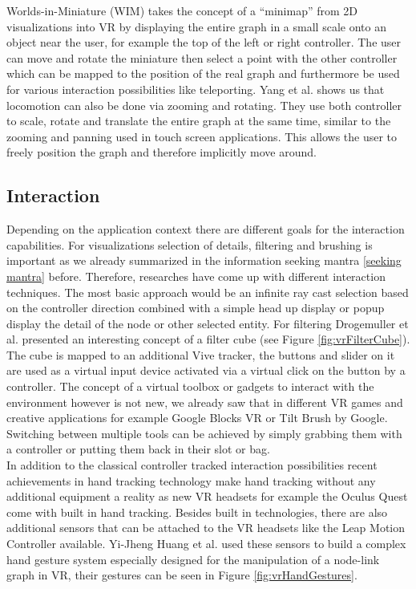 Worlds-in-Miniature (WIM) \cite{drogemuller_examining_2020} takes the concept of a “minimap” from 2D visualizations into VR by displaying the entire graph in a small scale onto an object near the user, for example the top of the left or right controller. The user can move and rotate the miniature then select a point with the other controller which can be mapped to the position of the real graph and furthermore be used for various interaction possibilities like teleporting. Yang et al. \cite{yang_embodied_2020} shows us that locomotion can also be done via zooming and rotating. They use both controller to scale, rotate and translate the entire graph at the same time, similar to the zooming and panning used in touch screen applications. This allows the user to freely position the graph and therefore implicitly move around.

\subsection{Interaction}

Depending on the application context there are different goals for the interaction capabilities. For visualizations selection of details, filtering and brushing is important as we already summarized in the information seeking mantra \ref{seeking mantra} before. Therefore, researches have come up with different interaction techniques. The most basic approach would be an infinite ray cast selection based on the controller direction combined with a simple head up display or popup display the detail of the node or other selected entity. 
For filtering Drogemuller et al. \cite{drogemuller_vrige_2017} presented an interesting concept of a filter cube (see Figure \ref{fig:vrFilterCube}). The cube is mapped to an additional Vive tracker, the buttons and slider on it are used as a virtual input device activated via a virtual click on the button by a controller. 
The concept of a virtual toolbox or gadgets to interact with the environment however is not new, we already saw that in different VR games and creative applications for example Google Blocks VR or Tilt Brush by Google. Switching between multiple tools can be achieved by simply grabbing them with a controller or putting them back in their slot or bag.\\
In addition to the classical controller tracked interaction possibilities recent achievements in hand tracking technology make hand tracking without any additional equipment a reality as new VR headsets for example the Oculus Quest come with built in hand tracking. Besides built in technologies, there are also additional sensors that can be attached to the VR headsets like the Leap Motion Controller available. Yi-Jheng Huang et al. \cite{yi-jheng_huang_gesture_2017} used these sensors to build a complex hand gesture system especially designed for the manipulation of a node-link graph in VR, their gestures can be seen in Figure \ref{fig:vrHandGestures}. 

